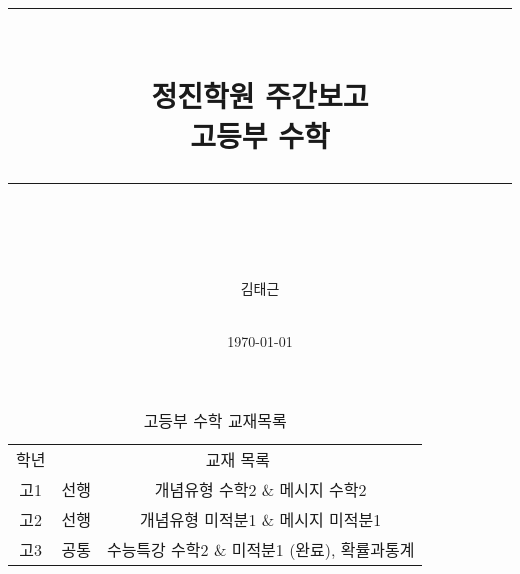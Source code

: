\documentclass[idxtotoc,hyperref,openany]{labbook} %
\newcommand{\HRule}{\rule{\linewidth}{0.5mm}} %
\begin{document}

\frontmatter %
\title{
\begin{center}
\HRule \\[0.4cm]
{\Huge \bfseries 정진학원 주간보고  \\[0.5cm] \Large 고등부 수학}\\[0.4cm] %
\HRule \\[1.5cm]
\end{center}
}
\author{\LARGE 김태근 \\  \\[2cm]} %
\date{\today} %
\maketitle

\tableofcontents

\mainmatter %












\begin{table}[h]
\centering
\begin{adjustbox}{width=.9\textwidth}
\begin{tabular}{c||c|c}
\toprule
\midrule
학년 & \multicolumn{2}{c}{교재 목록} \\
\hhline{=||==}
고1 & 선행 & 개념유형 수학2 \& 메시지 수학2 \\
\hline
고2 & 선행 & 개념유형 미적분1 \& 메시지 미적분1\\
\hline
\multirow{1}{*}{고3} & 공통 & 수능특강 수학2 \& 미적분1 (완료), 확률과통계 \\

\hline
\end{tabular}
\end{adjustbox}
\caption{\label{tab:i} 고등부 수학 교재목록 }
\end{table}
\end{document}
